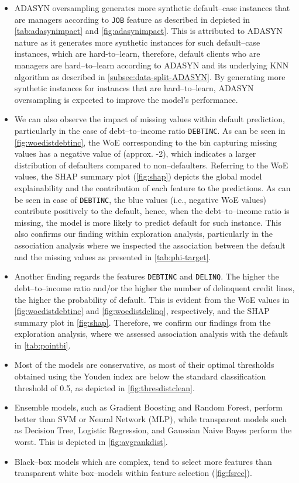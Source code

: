 \begin{itemize}\setlength\itemsep{0em}
    \item ADASYN oversampling generates more synthetic default--case instances that are managers according to \texttt{JOB} feature as described in depicted in \autoref{tab:adasynimpact} and \autoref{fig:adasynimpact}.
    This is attributed to ADASYN nature as it generates more synthetic instances for such default--case instances, which are hard-to--learn, therefore, default clients who are managers are hard--to--learn according to ADASYN and its underlying KNN algorithm as described in \autoref{subsec:data-split-ADASYN}. By generating more synthetic instances for instances that are hard--to--learn, ADASYN oversampling is expected to improve the model's performance.
    \item We can also observe the impact of missing values within default prediction, particularly in the case of debt--to--income ratio \texttt{DEBTINC}. As can be seen in \autoref{fig:woedistdebtinc}, the WoE corresponding to the bin capturing missing values has a negative value of (approx. -2), which indicates a larger distribution of defaulters compared to non--defaulters.
     Referring to the WoE values, the SHAP summary plot (\autoref{fig:shap}) depicts the global model explainability and the contribution of each feature to the predictions. As can be seen in case of \texttt{DEBTINC}, the blue values (i.e., negative WoE values) contribute positively to the default, hence, when the debt--to--income ratio is missing, the model is more likely to predict default for such instance.
     This also confirms our finding within exploration analysis, particularly in the association analysis where we inspected the association between the default and the missing values as presented in \autoref{tab:phi-target}.
    \item Another finding regards the features \texttt{DEBTINC} and \texttt{DELINQ}. The higher the debt--to--income ratio and/or the higher the number of delinquent credit lines, the higher the probability of default. This is evident from the WoE values in \autoref{fig:woedistdebtinc} and \autoref{fig:woedistdelinq}, respectively, and the SHAP summary plot in \autoref{fig:shap}.
    Therefore, we confirm our findings from the exploration analysis, where we assessed association analysis with the default in \autoref{tab:pointbi}.
    \item Most of the models are conservative, as most of their optimal thresholds obtained using the Youden index are below the standard classification threshold of 0.5, as depicted in \autoref{fig:thresdistclean}.
    \item Ensemble models, such as Gradient Boosting and Random Forest, perform better than SVM or Neural Network (MLP), while transparent models such as Decision Tree, Logistic Regression, and Gaussian Naive Bayes perform the worst. This is depicted in \autoref{fig:avgrankdist}.
    \item Black--box models which are complex, tend to select more features than transparent white box--models within feature selection (\autoref{fig:fsrec}).
\end{itemize}
